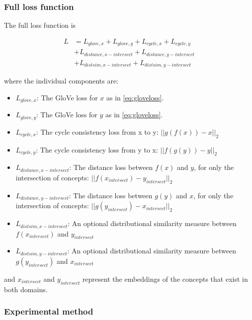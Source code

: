 \subsubsection{Full loss function}

The full loss function is

\begin{equation}
\label{eq:fulllossfunction}
\begin{split}
L & = L_{glove, x} + L_{glove, y} + L_{cycle, x} + L_{cycle, y} \\
  & + L_{distance, x-intersect} + L_{distance, y-intersect} \\
  & + L_{distsim, x-intersect} + L_{distsim, y-intersect}
\end{split}
\end{equation}

where the individual components are: 

\begin{itemize}
    \item $L_{glove, x}$: The GloVe loss for $x$ as in \ref{eq:gloveloss}. 
    \item $L_{glove, y}$: The GloVe loss for $y$ as in \ref{eq:gloveloss}. 
    \item $L_{cycle, x}$: The cycle consistency loss from x to y: $||g(f(x)) - x||_2$
    \item $L_{cycle, y}$: The cycle consistency loss from y to x: $||f(g(y)) - y||_2$
    \item $L_{distance, x-intersect}$: The distance loss between $f(x)$ and $y$, for only the intersection of concepts: $||f(x_{intersect}) - y_{intersect}||_2$
    \item $L_{distance, y-intersect}$: The distance loss between $g(y)$ and $x$, for only the intersection of concepts: $||g(y_{intersect}) - x_{intersect}||_2$
    \item $L_{distsim, x-intersect}$: An optional distributional similarity measure between $f(x_{intersect})$ and $y_{intersect}$
    \item $L_{distsim, y-intersect}$: An optional distributional similarity measure between $g(y_{intersect})$ and $x_{intersect}$
\end{itemize}

and $x_{intersect}$ and $y_{intersect}$ represent the embeddings of the concepts that exist in both domains. 

\subsubsection{Experimental method}

